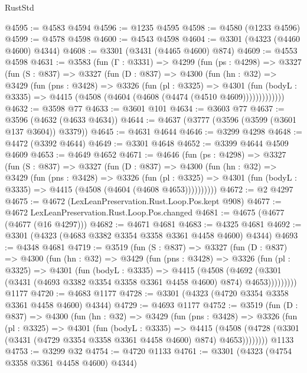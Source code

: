 \begin{lexlean}{RustStd}
\begin{coremodule}
@4595 := @4583 @4594
@4596 := @1235 @4595
@4598 := @4580 (@1233 @4596)
@4599 := @4578 @4598
@4600 := @4543 @4598
@4604 := @3301 (@4323 (@4460 @4600) @4344)
@4608 := @3301 (@3431 (@4465 @4600) @874)
@4609 := @4553 @4598
@4631 := @3583
    (fun (Γ : @3331) =>
    @4299
      (fun (ps : @4298) =>
      @3327
        (fun (S : @837) =>
        @3327
          (fun (D : @837) =>
          @4300
            (fun (hn : @32) =>
            @3429
              (fun (pns : @3428) =>
              @3326
                (fun (pl : @3325) =>
                @4301
                  (fun (bodyL : @3335) =>
                  @4415 (@4508 (@4604 (@4608 (@4474 (@4510 @4609)))))))))))))
@4632 := @3598 @77
@4633 := @3601 @101
@4634 := @3603 @77
@4637 := @3596 (@4632 (@4633 @4634))
@4644 := @4637 (@3777 (@3596 (@3599 (@3601 @137 @3604)) @3379))
@4645 := @4631 @4644
@4646 := @3299 @4298
@4648 := @4472 (@3392 @4644)
@4649 := @3301 @4648
@4652 := @3399 @4644 @4509 @4609
@4653 := @4649 @4652
@4671 := @4646
    (fun (ps : @4298) =>
    @3327
      (fun (S : @837) =>
      @3327
        (fun (D : @837) =>
        @4300
          (fun (hn : @32) =>
          @3429
            (fun (pns : @3428) =>
            @3326
              (fun (pl : @3325) =>
              @4301 (fun (bodyL : @3335) => @4415 (@4508 (@4604 (@4608 @4653))))))))))
@4672 := @2 @4297
@4675 := @4672 (LexLeanPreservation.Rust.Loop.Pos.kept @908)
@4677 := @4672 LexLeanPreservation.Rust.Loop.Pos.changed
@4681 := @4675 (@4677 (@4677 (@16 @4297)))
@4682 := @4671 @4681
@4683 := @4325 @4681
@4692 := @3301 (@4323 (@4683 @3382 @3354 @3358 @3361 @4458 @4600) @4344)
@4693 := @4348 @4681
@4719 := @3519
    (fun (S : @837) =>
    @3327
      (fun (D : @837) =>
      @4300
        (fun (hn : @32) =>
        @3429
          (fun (pns : @3428) =>
          @3326
            (fun (pl : @3325) =>
            @4301
              (fun (bodyL : @3335) =>
              @4415
                (@4508
                  (@4692
                    (@3301 (@3431 (@4693 @3382 @3354 @3358 @3361 @4458 @4600) @874) @4653)))))))))
    @1177
@4720 := @4683 @1177
@4728 := @3301 (@4323 (@4720 @3354 @3358 @3361 @4458 @4600) @4344)
@4729 := @4693 @1177
@4752 := @3519
    (fun (D : @837) =>
    @4300
      (fun (hn : @32) =>
      @3429
        (fun (pns : @3428) =>
        @3326
          (fun (pl : @3325) =>
          @4301
            (fun (bodyL : @3335) =>
            @4415
              (@4508 (@4728 (@3301 (@3431 (@4729 @3354 @3358 @3361 @4458 @4600) @874) @4653))))))))
    @1133
@4753 := @3299 @32
@4754 := @4720 @1133
@4761 := @3301 (@4323 (@4754 @3358 @3361 @4458 @4600) @4344)

\end{coremodule}
\end{lexlean}
